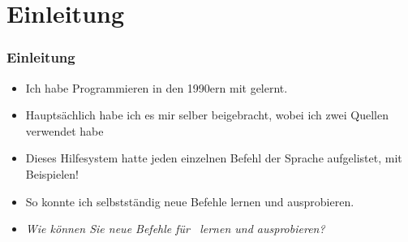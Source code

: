 \documentclass[aspectratio=169,mathserif,notheorems]{beamer}%
\subtitle{9.~Zwischenspiel:~Python Dokumentation und Informationsquellen}%
\begin{document}
%
%
\startPresentation%
%
\section{Einleitung}%
\begin{frame}%
\frametitle{Einleitung}%
\parbox{0.65\linewidth}{%
\begin{itemize}%
\item Ich habe Programmieren in den 1990ern mit  gelernt.%
\item<2-> Hauptsächlich habe ich es mir selber beigebracht, wobei ich zwei Quellen verwendet habe%
%
\item<5-> Dieses Hilfesystem hatte jeden einzelnen Befehl der Sprache aufgelistet, mit Beispielen!%
\item<6-> So konnte ich selbstständig neue Befehle lernen und ausprobieren.%
\item<7-> \emph{Wie können Sie neue Befehle für \python\ lernen und ausprobieren?}
\end{itemize}}%
%
%
\end{frame}%
%
\end{document}
